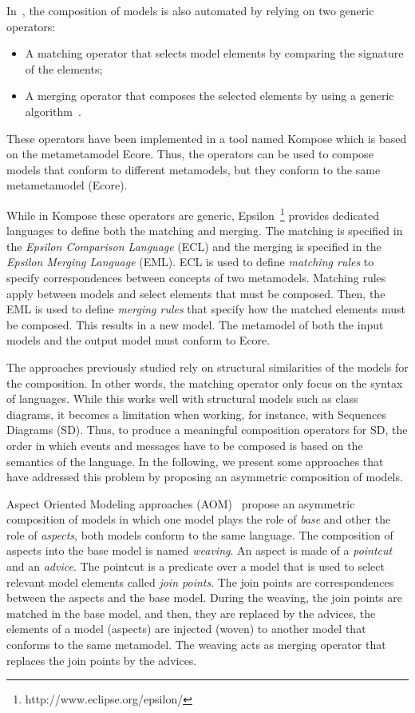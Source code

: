 In~\cite{kompose}, the composition of models is also automated by relying on two generic operators: 
	\begin{itemize}
		\item A matching operator that selects model elements by comparing the signature of the elements;
		\item A merging operator that composes the selected elements by using a generic algorithm~\cite{signaturecomposebib}.
	\end{itemize}
These operators have been implemented in a tool named Kompose which is based on the metametamodel Ecore. Thus, the operators can be used to compose models that conform to different metamodels, but they conform to the same metametamodel (\ie Ecore).

While in Kompose these operators are generic, Epsilon~\cite{epsilon}\footnote{http://www.eclipse.org/epsilon/} provides dedicated languages to define both the matching and merging. The matching is specified in the \emph{Epsilon Comparison Language} (ECL) and the merging is specified in the \emph{Epsilon Merging Language} (EML). ECL is used to define \emph{matching rules} to specify correspondences between concepts of two metamodels. Matching rules apply between models and select elements that must be composed. Then, the EML is used to define \emph{merging rules} that specify how the matched elements must be composed. This results in a new model. The metamodel of both the input models and the output model must conform to Ecore.

The approaches previously studied rely on structural similarities of the models for the composition. In other words, the matching operator only focus on the syntax of languages. While this works well with structural models such as class diagrams, it becomes a limitation when working, for instance, with Sequences Diagrams (SD). Thus, to produce a meaningful composition operators for SD, the order in which events and messages have to be composed is based on the semantics of the language. In the following, we present some approaches that have addressed this problem by proposing an asymmetric composition of models. 

Aspect Oriented Modeling approaches (AOM)~\cite{sequenceweavingbib,rambib,composdbib} propose an asymmetric composition of models in which one model plays the role of \emph{base} and other the role of \emph{aspects}, both models conform to the same language. The composition of aspects into the base model is named \emph{weaving}. An aspect is made of a \emph{pointcut} and an \emph{advice}. The pointcut is a predicate over a model that is used to select relevant model elements called \emph{join points}. The join points are correspondences between the aspects and the base model. During the weaving, the join points are matched in the base model, and then, they are replaced by the advices, \ie the elements of a model (aspects) are injected (woven) to another model that conforms to the same metamodel. The weaving acts as merging operator that replaces the join points by the advices. 

